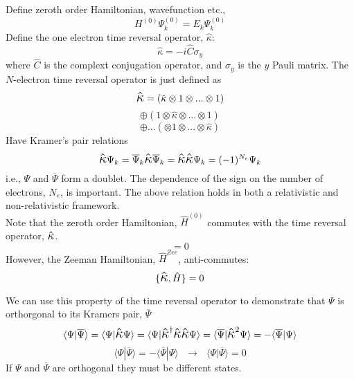 \documentclass[12pt]{article}
\newcommand{\K}{\mathlarger{\mathlarger{\hat{\kappa}}}}
\begin{document}
\noindent Define zeroth order Hamiltonian, wavefunction etc.,
\begin{equation}
H^{(0)}\Psi_{k}^{(0)} = E_{k}\Psi_{k}^{(0)}
\end{equation}
\noindent Define the one electron time reversal operator, $\hat{\kappa}$:
\begin{equation}
\hat{\kappa} = -i \hat{C}\sigma_{y}
\end{equation}
\noindent where $\hat{C}$ is the complext conjugation operator, and
$\sigma_{y}$ is the $y$ Pauli matrix. The $N$-electron time reversal operator
is just defined as 
\begin{equation*}
\K = 
(\hat{\kappa}\otimes 1 \otimes ... \otimes 1)
\end{equation*}
\begin{equation*}
\oplus
(1 \otimes \hat{\kappa}\otimes  ... \otimes 1)
\end{equation*}
\begin{equation}
\oplus
...
(\otimes 1 \otimes  ... \otimes \hat{\kappa})
\end{equation}
\noindent Have Kramer's pair relations
\begin{equation}
\K \Psi_{k} = \overline{\Psi}_{k}
\K \overline{\Psi}_{k} = \K\K\Psi_{k} = (-1)^{N_{e}} \Psi_{k}
\end{equation}
\noindent i.e., $\Psi$ and $\overline{\Psi}$ form a doublet.  The dependence
of the sign on the number of electrons, $N_{e}$, is important. The above relation 
holds in both a relativistic and non-relativistic framework.\\

\noindent Note that the zeroth order Hamiltonian, $\hat{H}^{(0)}$ commutes with the time reversal operator, $\K$.
\begin{equation}
[\K, \hat{H} ] = 0 
\end{equation}
\noindent However, the Zeeman Hamiltonian, $\hat{H}^{Zee}$, anti-commutes:
\begin{equation}
\{\K, \hat{H} \} = 0 
\end{equation}
\noindent 

\noindent We can use this property of the time reversal operator to demonstrate
that $\Psi$ is orthorgonal to its Kramers pair, $\overline{\Psi}$\\
\begin{equation}
\langle \Psi | \overline\Psi  \rangle=
\langle \Psi |\K \Psi  \rangle=
\langle \Psi | \K^{\dagger}\K\K\Psi  \rangle=
\langle \overline{\Psi} | \K^{2}\Psi  \rangle=
-\langle \overline{\Psi} | \Psi  \rangle
\end{equation}
\begin{equation}
\langle \Psi | \overline\Psi  \rangle=
-\langle \overline{\Psi} | \Psi  \rangle 
\text{ \ \ \ \ } \rightarrow \text{ \ \ \ \ }
\langle \Psi | \overline\Psi  \rangle= 0
\end{equation}
\noindent If $\Psi$ and $\overline{\Psi}$ are orthogonal they
must be different states.\\
\end{document}
